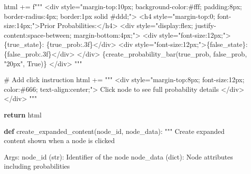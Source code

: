 \documentclass[
  11pt,
  letterpaper,
]{book}
\newenvironment{Shaded}{\begin{snugshade}}{\end{snugshade}}
\newcommand{\CommentTok}[1]{\textcolor[rgb]{0.37,0.37,0.37}{#1}}
\newcommand{\ControlFlowTok}[1]{\textcolor[rgb]{0.00,0.23,0.31}{\textbf{#1}}}
\newcommand{\KeywordTok}[1]{\textcolor[rgb]{0.00,0.23,0.31}{\textbf{#1}}}
\newcommand{\NormalTok}[1]{\textcolor[rgb]{0.00,0.23,0.31}{#1}}
\newcommand{\OperatorTok}[1]{\textcolor[rgb]{0.37,0.37,0.37}{#1}}
\newcommand{\SpecialCharTok}[1]{\textcolor[rgb]{0.37,0.37,0.37}{#1}}
\newcommand{\SpecialStringTok}[1]{\textcolor[rgb]{0.13,0.47,0.30}{#1}}
\newcommand{\StringTok}[1]{\textcolor[rgb]{0.13,0.47,0.30}{#1}}
\newcommand{\VariableTok}[1]{\textcolor[rgb]{0.07,0.07,0.07}{#1}}
\begin{document}
\begin{Shaded}
\begin{Highlighting}[]
\NormalTok{        html }\OperatorTok{+=} \SpecialStringTok{f"""}
\SpecialStringTok{        \textless{}div style="margin{-}top:10px; background{-}color:\#fff; padding:8px; border{-}radius:4px; border:1px solid \#ddd;"\textgreater{}}
\SpecialStringTok{            \textless{}h4 style="margin{-}top:0; font{-}size:14px;"\textgreater{}Prior Probabilities:\textless{}/h4\textgreater{}}
\SpecialStringTok{            \textless{}div style="display:flex; justify{-}content:space{-}between; margin{-}bottom:4px;"\textgreater{}}
\SpecialStringTok{                \textless{}div style="font{-}size:12px;"\textgreater{}}\SpecialCharTok{\{}\NormalTok{true\_state}\SpecialCharTok{\}}\SpecialStringTok{: }\SpecialCharTok{\{}\NormalTok{true\_prob}\SpecialCharTok{:.3f\}}\SpecialStringTok{\textless{}/div\textgreater{}}
\SpecialStringTok{                \textless{}div style="font{-}size:12px;"\textgreater{}}\SpecialCharTok{\{}\NormalTok{false\_state}\SpecialCharTok{\}}\SpecialStringTok{: }\SpecialCharTok{\{}\NormalTok{false\_prob}\SpecialCharTok{:.3f\}}\SpecialStringTok{\textless{}/div\textgreater{}}
\SpecialStringTok{            \textless{}/div\textgreater{}}
\SpecialStringTok{            }\SpecialCharTok{\{}\NormalTok{create\_probability\_bar(true\_prob, false\_prob, }\StringTok{"20px"}\NormalTok{, }\VariableTok{True}\NormalTok{)}\SpecialCharTok{\}}
\SpecialStringTok{        \textless{}/div\textgreater{}}
\SpecialStringTok{        """}

    \CommentTok{\# Add click instruction}
\NormalTok{    html }\OperatorTok{+=} \StringTok{"""}
\StringTok{    \textless{}div style="margin{-}top:8px; font{-}size:12px; color:\#666; text{-}align:center;"\textgreater{}}
\StringTok{        Click node to see full probability details}
\StringTok{    \textless{}/div\textgreater{}}
\StringTok{    \textless{}/div\textgreater{}}
\StringTok{    """}

    \ControlFlowTok{return}\NormalTok{ html}

\KeywordTok{def}\NormalTok{ create\_expanded\_content(node\_id, node\_data):}
    \CommentTok{"""}
\CommentTok{    Create expanded content shown when a node is clicked}

\CommentTok{    Args:}
\CommentTok{        node\_id (str): Identifier of the node}
\CommentTok{        node\_data (dict): Node attributes including probabilities}


\end{Highlighting}
\end{Shaded}
\end{document}
